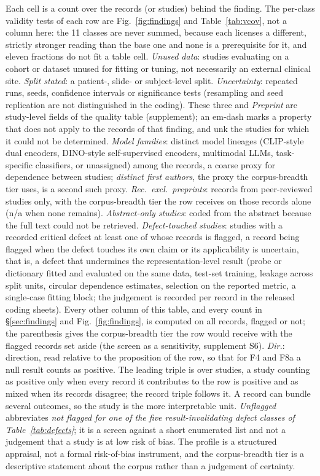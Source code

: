 \noindent\small Each cell is a count over the records (or studies) behind the finding. The per-class validity tests of each row are Fig.~\ref{fig:findings} and Table~\ref{tab:vcov}, not a column here: the 11 classes are never summed, because each licenses a different, strictly stronger reading than the base one and none is a prerequisite for it, and eleven fractions do not fit a table cell. \emph{Unused data}: studies evaluating on a cohort or dataset unused for fitting or tuning, not necessarily an external clinical site. \emph{Split stated}: a patient-, slide- or subject-level split. \emph{Uncertainty}: repeated runs, seeds, confidence intervals or significance tests (resampling and seed replication are not distinguished in the coding). These three and \emph{Preprint} are study-level fields of the quality table (supplement); an em-dash marks a property that does not apply to the records of that finding, and unk the studies for which it could not be determined. \emph{Model families}: distinct model lineages (CLIP-style dual encoders, DINO-style self-supervised encoders, multimodal LLMs, task-specific classifiers, or unassigned) among the records, a coarse proxy for dependence between studies; \emph{distinct first authors}, the proxy the corpus-breadth tier uses, is a second such proxy. \emph{Rec.\ excl.\ preprints}: records from peer-reviewed studies only, with the corpus-breadth tier the row receives on those records alone (n/a when none remains). \emph{Abstract-only studies}: coded from the abstract because the full text could not be retrieved. \emph{Defect-touched studies}: studies with a recorded critical defect at least one of whose records is flagged, a record being flagged when the defect touches its own claim or its applicability is uncertain, that is, a defect that undermines the representation-level result (probe or dictionary fitted and evaluated on the same data, test-set training, leakage across split units, circular dependence estimates, selection on the reported metric, a single-case fitting block; the judgement is recorded per record in the released coding sheets). Every other column of this table, and every count in \S\ref{sec:findings} and Fig.~\ref{fig:findings}, is computed on all records, flagged or not; the parenthesis gives the corpus-breadth tier the row would receive with the flagged records set aside (the screen as a sensitivity, supplement S6). \emph{Dir.}: direction, read relative to the proposition of the row, so that for F4 and F8a a null result counts as positive. The leading triple is over studies, a study counting as positive only when every record it contributes to the row is positive and as mixed when its records disagree; the record triple follows it. A record can bundle several outcomes, so the study is the more interpretable unit. \emph{Unflagged} abbreviates \emph{not flagged for one of the five result-invalidating defect classes of Table~\ref{tab:defects}}; it is a screen against a short enumerated list and not a judgement that a study is at low risk of bias. The profile is a structured appraisal, not a formal risk-of-bias instrument, and the corpus-breadth tier is a descriptive statement about the corpus rather than a judgement of certainty.
